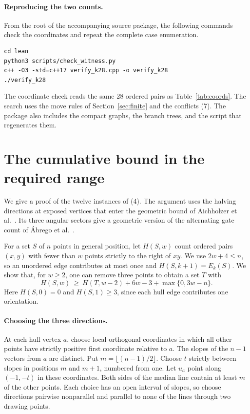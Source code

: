 \documentclass[11pt]{article}
\begin{document}
\paragraph{Reproducing the two counts.}
From the root of the accompanying source package, the following commands
check the coordinates and repeat the complete case enumeration.
\begin{verbatim}
cd lean
python3 scripts/check_witness.py
c++ -O3 -std=c++17 verify_k28.cpp -o verify_k28
./verify_k28
\end{verbatim}
The coordinate check reads the same 28 ordered pairs as Table~\ref{tab:coords}.
The search uses the move rules of Section~\ref{sec:finite} and the conflicts (7).
The package also includes the compact graphs, the branch trees, and the
script that regenerates them.

\appendix
\section{The cumulative bound in the required range}\label{app:low}
We give a proof of the twelve instances of (4). The argument uses the
halving directions at exposed vertices that enter the geometric bound
of Aichholzer et al.~\cite{aich}. Its three angular sectors give a
geometric version of the alternating gate count of Ábrego et
al.~\cite[Proposition~5]{extended}.

For a set \(S\) of \(n\) points in general position, let \(H(S,w)\)
count ordered pairs \((x,y)\) with fewer than \(w\) points strictly to
the right of \(xy\). We use \(2w+4\le n\), so an unordered edge
contributes at most once and \(H(S,k+1)=E_k(S)\). We show that, for
\(w\ge2\), one can remove three points to obtain a set \(T\) with
\begin{equation*}
 H(S,w)\ \ge\ H(T,w-2)+6w-3+\max\{0,3w-n\}.
\end{equation*}
Here \(H(S,0)=0\) and \(H(S,1)\ge3\), since each hull edge contributes
one orientation.

\paragraph{Choosing the three directions.}
At each hull vertex \(a\), choose local orthogonal coordinates in which
all other points have strictly positive first coordinate relative to
\(a\). The slopes of the \(n-1\) vectors from \(a\) are distinct. Put
\(m=\lfloor(n-1)/2\rfloor\). Choose \(t\) strictly between slopes in
positions \(m\) and \(m+1\), numbered from one. Let \(u_a\) point along
\((-1,-t)\) in these coordinates. Both sides of the median line
contain at least \(m\) of the other points. Each choice has an open
interval of slopes, so choose directions pairwise nonparallel and
parallel to none of the lines through two drawing points.
\end{document}
